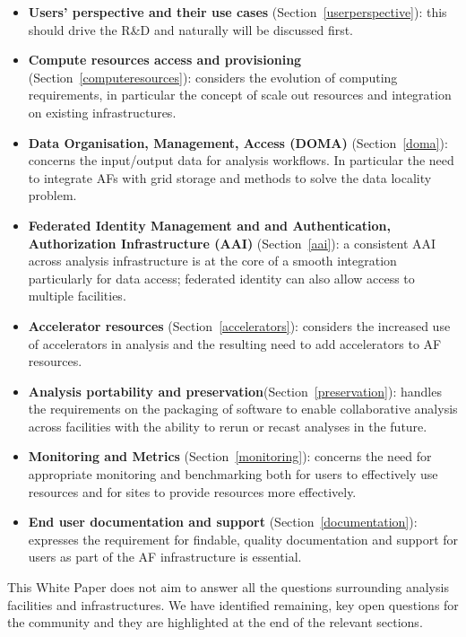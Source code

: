 \begin{itemize}
    \item \textbf{Users' perspective and their use cases} (Section~\ref{userperspective}): this should drive the R\&D and naturally will be discussed first.
    \item \textbf{Compute resources access and provisioning} (Section~\ref{computeresources}): considers the evolution of computing requirements, in particular the concept of scale out resources and integration on existing infrastructures.
    \item \textbf{Data Organisation, Management, Access (DOMA)} (Section~\ref{doma}): concerns the input/output data for analysis workflows. In particular the need to integrate AFs with grid storage and methods to solve the data locality problem. 
    \item \textbf{Federated Identity Management and and Authentication, Authorization Infrastructure (AAI)} (Section~\ref{aai}): a consistent AAI across analysis infrastructure is at the core of a smooth integration particularly for data access; federated identity can also allow access to multiple facilities. 
    \item \textbf{Accelerator resources} (Section~\ref{accelerators}): considers the increased use of accelerators in analysis and the resulting need to add accelerators to AF resources.
    \item \textbf{Analysis portability and preservation}(Section~\ref{preservation}): handles the requirements on the packaging of software to enable collaborative analysis across facilities with the ability to rerun or recast analyses in the future. 
    \item \textbf{Monitoring and Metrics} (Section~\ref{monitoring}): concerns the need for appropriate monitoring and benchmarking both for users to effectively use resources and for sites to provide resources more effectively.
    \item \textbf{End user documentation and support} (Section~\ref{documentation}): expresses the requirement for  findable, quality documentation and support for users as part of the AF infrastructure is essential.

\end{itemize} 


This White Paper does not aim to answer all the questions surrounding analysis facilities and infrastructures. We have identified remaining, key open questions for the community and they are highlighted at the end of the relevant sections.

